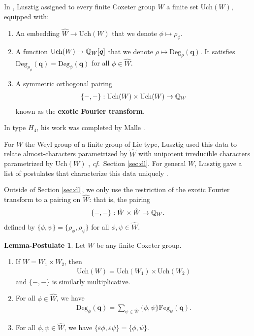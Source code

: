 \documentclass[a4paper,10pt,leqno]{amsart}
\theoremstyle{plain}
\theoremstyle{plain}
\theoremstyle{plain}
\theoremstyle{definition}
\newtheorem{lempost}[thm]{Lemma-Postulate}
\theoremstyle{remark}
\newcommand{\dfemph}[1]{\textbf{#1}}
\newcommand{\Q}{\bm{q}}
\newcommand{\UCh}{\mathrm{Uch}}
\newcommand{\UDeg}{\mathrm{Deg}}
\newcommand{\FDeg}{\mathrm{Feg}}
\begin{document}
\subsection{}\label{subsec:fourier}

In \cite{lusztig_1984, lusztig_1993, lusztig_1994}, Lusztig assigned to every finite Coxeter group $W$ a finite set $\UCh(W)$, equipped with:
\begin{enumerate}
\item 	An embedding $\hat{W} \to \UCh(W)$ that we denote $\phi \mapsto \rho_\phi$.
\item 	A function $\UCh(W) \to \bb{Q}_W[\Q]$ that we denote $\rho \mapsto \UDeg_\rho(\Q)$.
		It satisfies $\UDeg_{\rho_\phi}(\Q) = \UDeg_\phi(\Q)$ for all $\phi \in \hat{W}$. 
\item 	A symmetric orthogonal pairing
\begin{align}
\{-, -\} : \UCh(W) \times \UCh(W) \to \bb{Q}_W
\end{align}
known as the \dfemph{exotic Fourier transform}.
\end{enumerate}
In type $H_4$, his work was completed by Malle \cite{malle}.

For $W$ the Weyl group of a finite group of Lie type, Lusztig used this data to relate almost-characters parametrized by $\hat{W}$ with unipotent irreducible characters parametrized by $\UCh(W)$ \cite{lusztig_1984}, \emph{cf.}\ Section \ref{sec:dl}.
For general $W$, Lusztig gave a list of postulates that characterize this data uniquely \cite[\S{2}]{lusztig_1993}.

Outside of Section \ref{sec:dl}, we only use the restriction of the exotic Fourier transform to a pairing on $\hat{W}$: that is, the pairing
\begin{align}
\{-, -\} : \hat{W} \times \hat{W} \to \mathbb{Q}_W.
\end{align}
defined by $\{\phi, \psi\} = \{\rho_\phi, \rho_\psi\}$ for all $\phi, \psi \in \hat{W}$.

\begin{lempost}\label{lempost:fourier}
Let $W$ be any finite Coxeter group.
\begin{enumerate}
\item 	
		If $W= W_1 \times W_2$, then 
		\begin{align}
		\UCh(W) = \UCh(W_1) \times \UCh(W_2)
		\end{align}
		and $\{-, -\}$ is similarly multiplicative.
\item 	
		For all $\phi \in \hat{W}$, we have
\begin{align}
\UDeg_\phi(\Q) = \sum_{\psi \in \hat{W}} {\{\phi, \psi\}} \FDeg_\psi(\Q).
\end{align}
\item 	
		For all $\phi, \psi \in \hat{W}$, we have $\{\varepsilon \phi, \varepsilon \psi\} = \{\phi, \psi\}$.
\end{enumerate}
\end{lempost}
\end{document}
